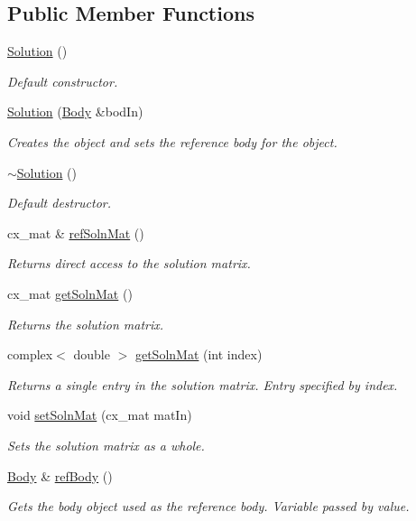 \subsection*{Public Member Functions}
\begin{DoxyCompactItemize}
\item 
\hyperlink{class_solution_ab55bd4b023d596ce11aaf737b9a6123b}{Solution} ()
\begin{DoxyCompactList}\small\item\em Default constructor. \end{DoxyCompactList}\item 
\hyperlink{class_solution_af1d658086ba6b4b0b78ffd985e85f06c}{Solution} (\hyperlink{class_body}{Body} \&bod\-In)
\begin{DoxyCompactList}\small\item\em Creates the object and sets the reference body for the object. \end{DoxyCompactList}\item 
\hyperlink{class_solution_a5d245f7409aacf6ace5e965b7879a580}{$\sim$\-Solution} ()
\begin{DoxyCompactList}\small\item\em Default destructor. \end{DoxyCompactList}\item 
cx\-\_\-mat \& \hyperlink{class_solution_a97e6a64afec87dd0fa217f1d49449ac9}{ref\-Soln\-Mat} ()
\begin{DoxyCompactList}\small\item\em Returns direct access to the solution matrix. \end{DoxyCompactList}\item 
cx\-\_\-mat \hyperlink{class_solution_a00801ca01862410a65fba3215bc8a789}{get\-Soln\-Mat} ()
\begin{DoxyCompactList}\small\item\em Returns the solution matrix. \end{DoxyCompactList}\item 
complex$<$ double $>$ \hyperlink{class_solution_a8f850820d65445470f4a0a5351f990e7}{get\-Soln\-Mat} (int index)
\begin{DoxyCompactList}\small\item\em Returns a single entry in the solution matrix. Entry specified by index. \end{DoxyCompactList}\item 
void \hyperlink{class_solution_a501a04b48ca1e5150dcef9b898085deb}{set\-Soln\-Mat} (cx\-\_\-mat mat\-In)
\begin{DoxyCompactList}\small\item\em Sets the solution matrix as a whole. \end{DoxyCompactList}\item 
\hyperlink{class_body}{Body} \& \hyperlink{class_solution_a95519db148bcece14c88aab53f4ced0e}{ref\-Body} ()
\begin{DoxyCompactList}\small\item\em Gets the body object used as the reference body. Variable passed by value. \end{DoxyCompactList}\end{DoxyCompactItemize}
